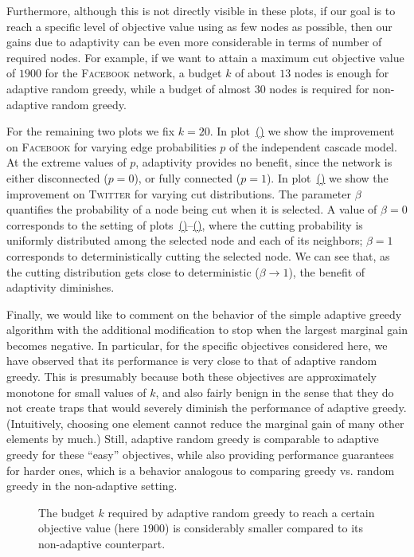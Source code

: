 \documentclass{article}
\newlength\figureheight
\newlength\figurewidth
\newcommand{\subcapref}[1]{\hyperref[#1]{\mbox{(\subref*{#1})}}}
\newcommand{\fbook}{\textsc{Facebook}\xspace}
\newcommand{\twitter}{\textsc{Twitter}\xspace}
\begin{document}
Furthermore, although this is not directly visible in these plots, if our goal is to reach a specific level of objective value using as few nodes as possible, then our gains due to adaptivity can be even more considerable in terms of number of required nodes.
For example, if we want to attain a maximum cut objective value of $1900$ for the \fbook network, a budget $k$ of about $13$ nodes is enough for adaptive random greedy, while a budget of almost $30$ nodes is required for non-adaptive random greedy.

For the remaining two plots we fix $k=20$.
In plot~\subcapref{fig:pinf_ego_fb} we show the improvement on \fbook for varying edge probabilities $p$ of the independent cascade model.
At the extreme values of $p$, adaptivity provides no benefit, since the network is either disconnected ($p=0$), or fully connected ($p=1$).
In plot~\subcapref{fig:pmc_twitter} we show the improvement on \twitter for varying cut distributions.
The parameter $\beta$ quantifies the probability of a node being cut when it is selected.
A value of $\beta=0$ corresponds to the setting of plots~\subcapref{fig:mc_ego_fb}--\subcapref{fig:mc_twitter}, where the cutting probability is uniformly distributed among the selected node and each of its neighbors; $\beta=1$ corresponds to deterministically cutting the selected node.
We can see that, as the cutting distribution gets close to deterministic ($\beta \to 1$), the benefit of adaptivity diminishes.

Finally, we would like to comment on the behavior of the simple adaptive greedy algorithm with the additional modification to stop when the largest marginal gain becomes negative.
In particular, for the specific objectives considered here, we have observed that its performance is very close to that of adaptive random greedy.
This is presumably because both these objectives are approximately monotone for small values of $k$, and also fairly benign in the sense that they do not create traps that would severely diminish the performance of adaptive greedy.
(Intuitively, choosing one element cannot reduce the marginal gain of many other elements by much.)
Still, adaptive random greedy is comparable to adaptive greedy for these ``easy'' objectives, while also providing performance guarantees for harder ones, which is a behavior analogous to comparing greedy vs. random greedy in the non-adaptive setting.

\setlength{}
\setlength{}
\begin{figure}[tb]
  \centering
  
  \caption{The budget $k$ required by adaptive random greedy to reach a certain objective value (here $1900$) is considerably smaller compared to its non-adaptive counterpart.}
  \label{fig:fs_ego_fb}
\end{figure}
\end{document}
